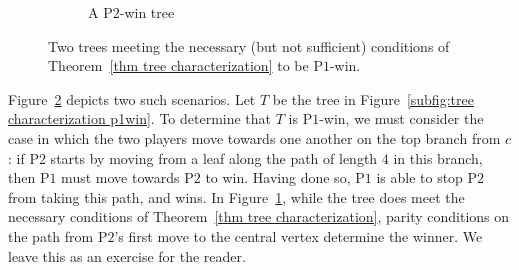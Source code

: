 \documentclass{article}
\theoremstyle{plain}
\theoremstyle{definition}
\newcommand{\ves}[1]{{\color{green!60!black}\textsc{Vesna:} #1}}
\DeclareRobustCommand{\calum}[1]{{\color{white}\sethlcolor{black!66}{\hl{\sf Calum: #1}}}}
\newcommand{\alexander}[1]{{\color{purple}\textsc{Alexander:} #1}}
\def\pone{{\rm{P}\ensuremath{1}}}
\def\ptwo{{\rm{P}\ensuremath{2}}}
\def\ptwoposs{{\rm{P}\ensuremath{2}'s}}
\begin{document}
\begin{figure}[hbt]
\begin{subfigure}{.45\textwidth}
        \caption{A \ptwo{}-win tree}
        \label{subfig:tree characterization p2win}
    \end{subfigure}
    \caption{Two trees meeting the necessary (but not sufficient) conditions of Theorem~\ref{thm tree characterization} to be \pone{}-win.}
    \label{fig:sufficiency_tree_thm}
\end{figure}

Figure~\ref{fig:sufficiency_tree_thm} depicts two such scenarios.
Let $T$ be the tree in Figure~\ref{subfig:tree characterization p1win}. To determine that $T$ is \pone{}-win, we must consider the case in which the two players move towards one another on the top branch from $c$: if \ptwo{} starts by moving from a leaf along the path of length $4$ in this branch, then \pone{} must move towards \ptwo{} to win. 
Having done so, \pone{} is able to stop \ptwo{} from taking this path, and wins.
In Figure~\ref{subfig:tree characterization p2win}, while the tree does meet the necessary conditions of Theorem~\ref{thm tree characterization}, parity conditions on the path from \ptwoposs{} first move to the central vertex determine the winner.
We leave this as an exercise for the reader.



\end{document}
